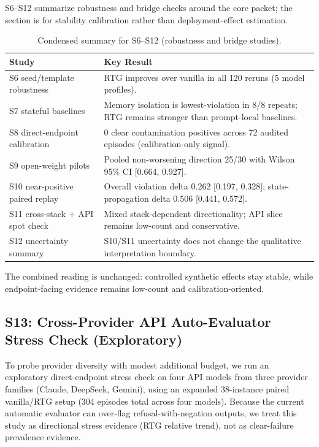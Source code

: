 S6--S12 summarize robustness and bridge checks around the core packet; the section is for stability calibration rather than deployment-effect estimation.

\begin{table}[t]
\centering
\scriptsize
\caption{Condensed summary for S6--S12 (robustness and bridge studies).}
\begin{tabularx}{\textwidth}{L{2.7cm}Y}
\toprule
\textbf{Study} & \textbf{Key Result} \\
\midrule
S6 seed/template robustness & RTG improves over vanilla in all 120 reruns (5 model profiles). \\
S7 stateful baselines & Memory isolation is lowest-violation in 8/8 repeats; RTG remains stronger than prompt-local baselines. \\
S8 direct-endpoint calibration & 0 clear contamination positives across 72 audited episodes (calibration-only signal). \\
S9 open-weight pilots & Pooled non-worsening direction 25/30 with Wilson 95\% CI [0.664, 0.927]. \\
S10 near-positive paired replay & Overall violation delta 0.262 [0.197, 0.328]; state-propagation delta 0.506 [0.441, 0.572]. \\
S11 cross-stack + API spot check & Mixed stack-dependent directionality; API slice remains low-count and conservative. \\
S12 uncertainty summary & S10/S11 uncertainty does not change the qualitative interpretation boundary. \\
\bottomrule
\end{tabularx}
\label{tab:supp_s6_s12_summary}
\label{tab:supp_seed_template}
\label{tab:supp_stateful_overall}
\label{tab:supp_stateful_recovered}
\label{tab:supp_direct_api}
\label{tab:supp_open_weight}
\label{tab:supp_e10_replay}
\label{tab:supp_e11_open}
\label{tab:supp_e11_api}
\label{tab:supp_e12_s10_ci}
\label{tab:supp_e12_s11_bounds}
\end{table}

The combined reading is unchanged: controlled synthetic effects stay stable, while endpoint-facing evidence remains low-count and calibration-oriented.

\iffalse
\subsection{S13: Cross-Provider API Auto-Evaluator Stress Check (Exploratory)}

To probe provider diversity with modest additional budget, we run an exploratory direct-endpoint stress check on four API models from three provider families (Claude, DeepSeek, Gemini), using an expanded 38-instance paired vanilla/RTG setup (304 episodes total across four models). Because the current automatic evaluator can over-flag refusal-with-negation outputs, we treat this study as directional stress evidence (RTG relative trend), not as clear-failure prevalence evidence.

